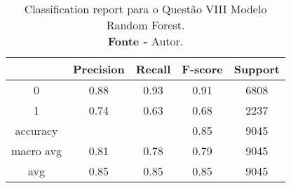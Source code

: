 % 
\begin{table}[H]
    \centering
    \begin{tabular}{@{}ccccc@{}}
    \toprule
     & \textbf{Precision} & \textbf{Recall} &\textbf{F-score} & \textbf{Support} \\ \midrule 
    0 & 0.88 & 0.93 & 0.91 & 6808 \\ 
    1 & 0.74 & 0.63 & 0.68 & 2237 \\ 
    accuracy &  &  & 0.85 & 9045 \\ 
    macro avg & 0.81 & 0.78 & 0.79 & 9045 \\ 
    avg & 0.85 & 0.85 & 0.85 & 9045 \\ 
    \end{tabular}
    \caption{Classification report para o Questão VIII Modelo Random Forest. \\ \textbf{Fonte -} Autor.}
    \label{tab: classification-report-Questão VIII Modelo Random Forest}
\end{table}